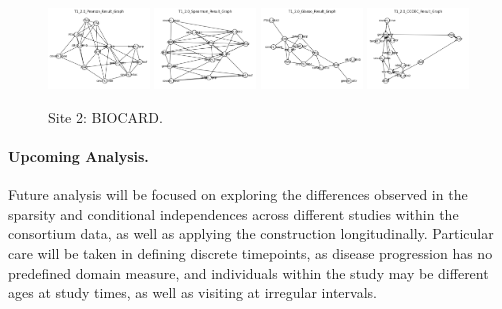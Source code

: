 \begin{figure}
    \includegraphics[width=0.24\textwidth]{chap6/figs/T1_2.0_Pearson_Result_Graph.png}
    \includegraphics[width=0.24\textwidth]{chap6/figs/T1_2.0_Spearman_Result_Graph.png}
    \includegraphics[width=0.24\textwidth]{chap6/figs/T1_2.0_Glasso_Result_Graph.png}
    \includegraphics[width=0.24\textwidth]{chap6/figs/T1_2.0_CODEC_Result_Graph.png}
    \caption{Site 2: BIOCARD.}
    \label{fig:site2}
\end{figure}

\paragraph{Upcoming Analysis.} Future analysis will be focused on exploring the differences observed in the sparsity and conditional independences across different studies within the consortium data, as well as applying the construction longitudinally. Particular care will be taken in defining discrete timepoints, as disease progression has no predefined domain measure, and individuals within the study may be different ages at study times, as well as visiting at irregular intervals.
